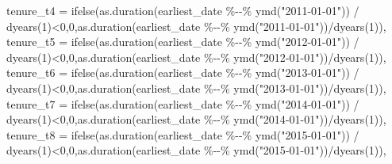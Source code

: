 \documentclass[
]{article}
\newenvironment{Shaded}{\begin{snugshade}}{\end{snugshade}}
\newcommand{\AttributeTok}[1]{\textcolor[rgb]{0.77,0.63,0.00}{#1}}
\newcommand{\DecValTok}[1]{\textcolor[rgb]{0.00,0.00,0.81}{#1}}
\newcommand{\FunctionTok}[1]{\textcolor[rgb]{0.00,0.00,0.00}{#1}}
\newcommand{\NormalTok}[1]{#1}
\newcommand{\SpecialCharTok}[1]{\textcolor[rgb]{0.00,0.00,0.00}{#1}}
\newcommand{\StringTok}[1]{\textcolor[rgb]{0.31,0.60,0.02}{#1}}
\begin{document}
\begin{Shaded}
\begin{Highlighting}[]
    \AttributeTok{tenure\_t4 =} \FunctionTok{ifelse}\NormalTok{(}\FunctionTok{as.duration}\NormalTok{(earliest\_date }\SpecialCharTok{\%{-}{-}\%} \FunctionTok{ymd}\NormalTok{(}\StringTok{"2011{-}01{-}01"}\NormalTok{)) }\SpecialCharTok{/} \FunctionTok{dyears}\NormalTok{(}\DecValTok{1}\NormalTok{)}\SpecialCharTok{\textless{}}\DecValTok{0}\NormalTok{,}\DecValTok{0}\NormalTok{,}\FunctionTok{as.duration}\NormalTok{(earliest\_date }\SpecialCharTok{\%{-}{-}\%} \FunctionTok{ymd}\NormalTok{(}\StringTok{"2011{-}01{-}01"}\NormalTok{))}\SpecialCharTok{/}\FunctionTok{dyears}\NormalTok{(}\DecValTok{1}\NormalTok{)),}
    \AttributeTok{tenure\_t5 =} \FunctionTok{ifelse}\NormalTok{(}\FunctionTok{as.duration}\NormalTok{(earliest\_date }\SpecialCharTok{\%{-}{-}\%} \FunctionTok{ymd}\NormalTok{(}\StringTok{"2012{-}01{-}01"}\NormalTok{)) }\SpecialCharTok{/} \FunctionTok{dyears}\NormalTok{(}\DecValTok{1}\NormalTok{)}\SpecialCharTok{\textless{}}\DecValTok{0}\NormalTok{,}\DecValTok{0}\NormalTok{,}\FunctionTok{as.duration}\NormalTok{(earliest\_date }\SpecialCharTok{\%{-}{-}\%} \FunctionTok{ymd}\NormalTok{(}\StringTok{"2012{-}01{-}01"}\NormalTok{))}\SpecialCharTok{/}\FunctionTok{dyears}\NormalTok{(}\DecValTok{1}\NormalTok{)),}
    \AttributeTok{tenure\_t6 =} \FunctionTok{ifelse}\NormalTok{(}\FunctionTok{as.duration}\NormalTok{(earliest\_date }\SpecialCharTok{\%{-}{-}\%} \FunctionTok{ymd}\NormalTok{(}\StringTok{"2013{-}01{-}01"}\NormalTok{)) }\SpecialCharTok{/} \FunctionTok{dyears}\NormalTok{(}\DecValTok{1}\NormalTok{)}\SpecialCharTok{\textless{}}\DecValTok{0}\NormalTok{,}\DecValTok{0}\NormalTok{,}\FunctionTok{as.duration}\NormalTok{(earliest\_date }\SpecialCharTok{\%{-}{-}\%} \FunctionTok{ymd}\NormalTok{(}\StringTok{"2013{-}01{-}01"}\NormalTok{))}\SpecialCharTok{/}\FunctionTok{dyears}\NormalTok{(}\DecValTok{1}\NormalTok{)),}
    \AttributeTok{tenure\_t7 =} \FunctionTok{ifelse}\NormalTok{(}\FunctionTok{as.duration}\NormalTok{(earliest\_date }\SpecialCharTok{\%{-}{-}\%} \FunctionTok{ymd}\NormalTok{(}\StringTok{"2014{-}01{-}01"}\NormalTok{)) }\SpecialCharTok{/} \FunctionTok{dyears}\NormalTok{(}\DecValTok{1}\NormalTok{)}\SpecialCharTok{\textless{}}\DecValTok{0}\NormalTok{,}\DecValTok{0}\NormalTok{,}\FunctionTok{as.duration}\NormalTok{(earliest\_date }\SpecialCharTok{\%{-}{-}\%} \FunctionTok{ymd}\NormalTok{(}\StringTok{"2014{-}01{-}01"}\NormalTok{))}\SpecialCharTok{/}\FunctionTok{dyears}\NormalTok{(}\DecValTok{1}\NormalTok{)),}
    \AttributeTok{tenure\_t8 =} \FunctionTok{ifelse}\NormalTok{(}\FunctionTok{as.duration}\NormalTok{(earliest\_date }\SpecialCharTok{\%{-}{-}\%} \FunctionTok{ymd}\NormalTok{(}\StringTok{"2015{-}01{-}01"}\NormalTok{)) }\SpecialCharTok{/} \FunctionTok{dyears}\NormalTok{(}\DecValTok{1}\NormalTok{)}\SpecialCharTok{\textless{}}\DecValTok{0}\NormalTok{,}\DecValTok{0}\NormalTok{,}\FunctionTok{as.duration}\NormalTok{(earliest\_date }\SpecialCharTok{\%{-}{-}\%} \FunctionTok{ymd}\NormalTok{(}\StringTok{"2015{-}01{-}01"}\NormalTok{))}\SpecialCharTok{/}\FunctionTok{dyears}\NormalTok{(}\DecValTok{1}\NormalTok{)),}


\end{Highlighting}
\end{Shaded}
\end{document}
